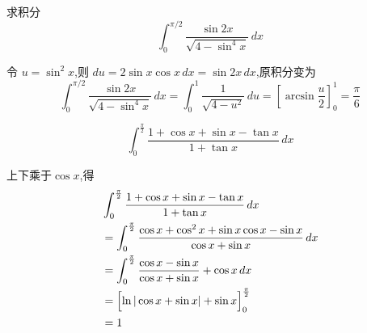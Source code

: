 \begin{questions}
    \question 求积分
    \[
    \int_{0}^{\pi/2} \frac{\sin 2x}{\sqrt{4 - \sin^4 x}} \, dx
    \]
    \begin{solution}
        令 $u = \sin^2 x$,则 $du = 2\sin x \cos x \, dx = \sin 2x \, dx$,原积分变为
        \[
        \int_{0}^{\pi/2} \frac{\sin 2x}{\sqrt{4 - \sin^4 x}} \, dx = \int_{0}^{1} \frac{1}{\sqrt{4 - u^2}} \, du = \left[\arcsin \frac{u}{2}\right]_{0}^{1} = \frac{\pi}{6}
        \]
    \end{solution}

    \question 
    \[
    \int_{0}^{\frac{\pi}{2}} \frac{1+\cos x + \sin x - \tan x}{1+\tan x} \, dx
    \]
    \begin{solution}
        上下乘于$\cos x$,得
        \begin{align*}
        &\int_{0}^{\frac{\pi}{2}} \frac{1+\cos x + \sin x - \tan x}{1+\tan x} \, dx \\
        &= \int_{0}^{\frac{\pi}{2}} \frac{\cos x + \cos^2 x + \sin x \cos x - \sin x}{\cos x + \sin x} \, dx \\
        &= \int_{0}^{\frac{\pi}{2}} \frac{\cos x - \sin x}{\cos x + \sin x} + \cos x \, dx \\
        &= \Bigl[ \ln|\cos x + \sin x| + \sin x \Bigr]_{0}^{\frac{\pi}{2}} \\
        &= 1
        \end{align*}
    \end{solution}


\end{questions}
